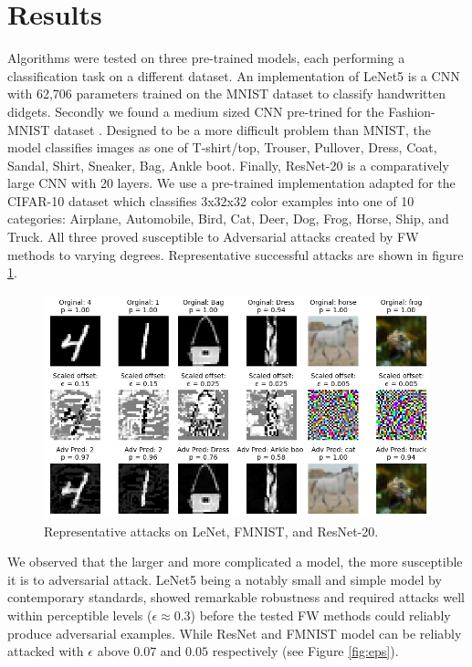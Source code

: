 \documentclass{article}
\begin{document}
\section{Results}
Algorithms were tested on three pre-trained models, each performing a classification task on a different dataset. An implementation of LeNet5 \cite{lenet, lenet-mdl} is a CNN with 62,706 parameters trained on the MNIST dataset to classify handwritten didgets. 
Secondly we found a medium sized CNN pre-trined for the Fashion-MNIST dataset \cite{fmnist, fmnist-mdl}. Designed to be a more difficult problem than MNIST, the model classifies images as one of T-shirt/top, Trouser, Pullover, Dress, Coat, Sandal, Shirt, Sneaker, Bag, Ankle boot. 
Finally, ResNet-20 \cite{resnet} is a comparatively large CNN with 20 layers. We use a pre-trained implementation adapted for the CIFAR-10 dataset \cite{cifar10} which classifies 3x32x32 color examples into one of 10 categories: Airplane, Automobile, Bird, Cat, Deer, Dog, Frog, Horse, Ship, and Truck. All three proved susceptible to Adversarial attacks created by FW methods to varying degrees. Representative successful attacks are shown in figure \ref{fig:adv_ex}.

\begin{figure}[H]
    \centering
    \includegraphics[width=\textwidth]{plots/adv_ex.png}
    \caption{Representative attacks on LeNet, FMNIST, and ResNet-20.}
    \label{fig:adv_ex}
\end{figure}

We observed that the larger and more complicated a model, the more susceptible it is to adversarial attack. 
LeNet5 being a notably small and simple model by contemporary standards, showed remarkable robustness and required attacks well within perceptible levels ($\epsilon \approx 0.3$) before the tested FW methods could reliably produce adversarial examples. While ResNet and FMNIST model can be reliably attacked with $\epsilon$ above $0.07$ and $0.05$ respectively (see Figure \ref{fig:eps}).
\end{document}
